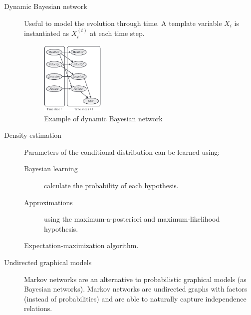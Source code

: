 \begin{description}
    \item[Dynamic Bayesian network] 
        Useful to model the evolution through time.
        A template variable $X_i$ is instantiated as $X_i^{(t)}$ at each time step.
        \begin{figure}[H]
            \centering
            \includegraphics[width=0.3\textwidth]{img/_dynamic_bn_example.pdf}
            \caption{Example of dynamic Bayesian network}
        \end{figure}

    \item[Density estimation] 
        Parameters of the conditional distribution can be learned using:
        \begin{description}
            \item[Bayesian learning] calculate the probability of each hypothesis.
            \item[Approximations] using the maximum-a-posteriori and maximum-likelihood hypothesis.
            \item[Expectation-maximization algorithm{\normalfont.}] 
        \end{description}

    \item[Undirected graphical models] 
        Markov networks are an alternative to probabilistic graphical models (as Bayesian networks).
        Markov networks are undirected graphs with factors (instead of probabilities) and
        are able to naturally capture independence relations.
\end{description}